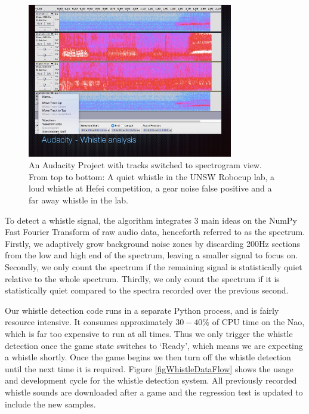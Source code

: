 \documentclass[runningheads,a4paper]{llncs}
\begin{document}
\begin{figure}[h]
\centering
\includegraphics[width=0.8\textwidth]{Figures/figWhistleAnalysis}
\caption{
   An Audacity Project with tracks switched to spectrogram view.
   From top to bottom:
   A quiet whistle in the UNSW Robocup lab,
   a loud whistle at Hefei competition,
   a gear noise false positive and
   a far away whistle in the lab.
}
\label{figWhistleAnalysis}
\end{figure}

To detect a whistle signal, the algorithm integrates 3 main ideas on the NumPy Fast Fourier Transform of raw audio data, henceforth referred to as the spectrum. Firstly, we adaptively grow background noise zones by discarding 200Hz sections from the low and high end of the spectrum, leaving a smaller signal to focus on. Secondly, we only count the spectrum if the remaining signal is statistically quiet relative to the whole spectrum. Thirdly, we only count the spectrum if it is statistically quiet compared to the spectra recorded over the previous second.

Our whistle detection code runs in a separate Python process, and is fairly resource intensive. It consumes approximately $30-40\%$ of CPU time on the Nao, which is far too expensive to run at all times. Thus we only trigger the whistle detection once the game state switches to `Ready', which means we are expecting a whistle shortly. Once the game begins we then turn off the whistle detection until the next time it is required. Figure \ref{figWhistleDataFlow} shows the usage and development cycle for the whistle detection system. All previously recorded whistle sounds are downloaded after a game and the regression test is updated to include the new samples.
\end{document}
